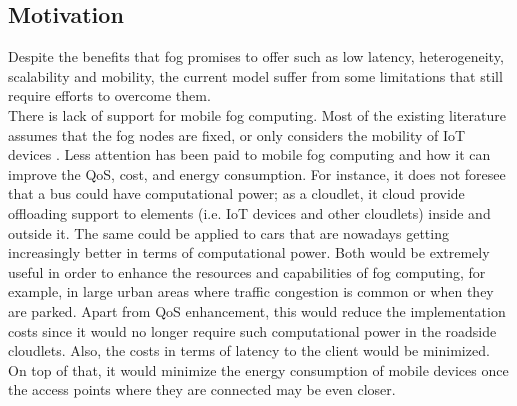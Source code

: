 \subsection{Motivation}\label{subsec:Motivation}
\noindent\tab Despite the benefits that fog promises to offer such as low latency, heterogeneity, scalability and mobility, the current model suffer from some limitations that still require efforts to overcome them.\\
\noindent\tab There is lack of support for mobile fog computing. Most of the existing literature assumes that the fog nodes are fixed, or only considers the mobility of IoT devices \cite{yousefpour2018all}. Less attention has been paid to mobile fog computing and how it can improve the QoS, cost, and energy consumption. For instance, it does not foresee that a bus could have computational power; as a cloudlet, it cloud provide offloading support to elements (i.e. IoT devices and other cloudlets) inside and outside it. The same could be applied to cars that are nowadays getting increasingly better in terms of computational power. Both would be extremely useful in order to enhance the resources and capabilities of fog computing, for example, in large urban areas where traffic congestion is common or when they are parked. Apart from QoS enhancement, this would reduce the implementation costs since it would no longer require such computational power in the roadside cloudlets. Also, the costs in terms of latency to the client would be minimized. On top of that, it would minimize the energy consumption of mobile devices once the access points where they are connected may be even closer.\\
